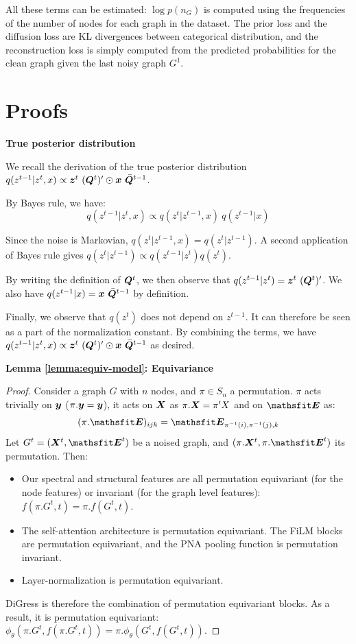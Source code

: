 \documentclass{article} %
\theoremstyle{plain}
\theoremstyle{definition}
\theoremstyle{remark}
\begin{document}
All these terms can be estimated: $\log p(n_G)$ is computed using the frequencies of the number of nodes for each graph in the dataset. The prior loss and the diffusion loss are KL divergences between categorical distribution, and the reconstruction loss is simply computed from the predicted probabilities for the clean graph given the last noisy graph $G^1$. 

\section{Proofs} \label{appendix:proofs}

\textbf{True posterior distribution}

We recall the derivation of the true posterior distribution $q(z^{t-1} | z^t, x) \propto {\bm{z}}^t ~({\bm{Q}}^t)' \odot {\bm{x}} ~\bar {{\bm{Q}}}^{t-1}$.


By Bayes rule, we have:
\begin{equation*}
q(z^{t-1} | z^t, x) \propto q(z^t | z^{t-1}, x)~ q(z^{t-1} | x)
\end{equation*}

Since the noise is Markovian, $ q(z^t | z^{t-1}, x) = q(z^t | z^{t-1})$. A second application of Bayes rule gives 
$q(z^t | z^{t-1}) \propto q(z^{t-1} | z^t) q(z^t)$.

By writing the definition of ${\bm{Q}}^t$, we then observe that $q(z^{t-1} | z^t) = {\bm{z}}^t ~({\bm{Q}}^t)'$. We also have $q(z^{t-1} | x) = {\bm{x}} ~\bar {{\bm{Q}}}^{t-1} $ by definition.

Finally, we observe that $q(z^t)$ does not depend on $z^{t-1}$. It can therefore be seen as a part of the normalization constant. By combining the terms, we have $q(z^{t-1} | z^t, x) \propto {\bm{z}}^t ~({\bm{Q}}^t)' \odot {\bm{x}} ~\bar {{\bm{Q}}}^{t-1}$ as desired.


\textbf{ Lemma \ref{lemma:equiv-model}: Equivariance}
\begin{proof}
Consider a graph $G$ with $n$ nodes, and $\pi \in S_n$ a permutation. $\pi$ acts trivially on ${\bm{y}}$ ($\pi . {\bm{y}} = {\bm{y}}$), it acts on ${\bm{X}}$ as $\pi . {\bm{X}} = \pi' X$ and on $\tE$ as: 
\[
(\pi . \tE)_{ijk} = \tE_{\pi^{-1}(i), \pi^{-1}(j), k}
\]
Let $G^t = (\mX^t, \tE^t) $ be a noised graph, and $(\pi . \mX^t, \pi . \tE^t)$ its permutation. Then:
\begin{itemize}
    \item Our spectral and structural features are all permutation equivariant (for the node features) or invariant (for the graph level features): $f(\pi.G^t, t) = \pi.f(G^t, t)$.
    \item The self-attention architecture is permutation equivariant. The FiLM blocks are permutation equivariant, and the PNA pooling function is permutation invariant.
    \item Layer-normalization is permutation equivariant.
\end{itemize}
DiGress is therefore the combination of permutation equivariant blocks.
As a result, it is permutation equivariant: $\phi_\theta(\pi . G^t, f(\pi. G^t, t)) = \pi . \phi_\theta(G^t, f(G^t, t))$.
\end{proof}
\end{document}
